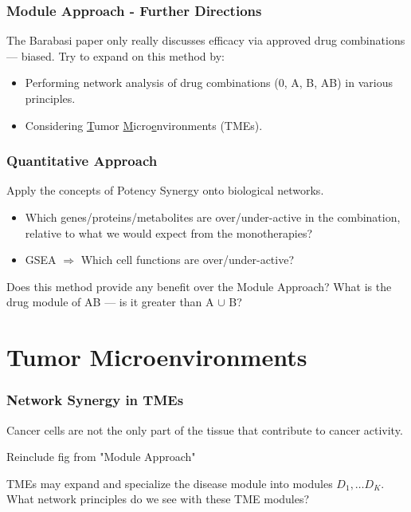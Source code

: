 \documentclass{beamer}
\begin{document}
\begin{frame}
  \frametitle{Module Approach - Further Directions}
  The Barabasi paper only really discusses efficacy via approved drug combinations --- biased.
  \vfill
  Try to expand on this method by:
  \begin{itemize}
      \item Performing network analysis of drug combinations (0, A, B, AB) in various principles.
      \item Considering \underline{T}umor \underline{M}icro\underline{e}nvironments (TMEs).
  \end{itemize}
\end{frame}

\begin{frame}
  \frametitle{Quantitative Approach}

  Apply the concepts of Potency Synergy onto biological networks.

  \begin{itemize}
    \item Which genes/proteins/metabolites are over/under-active in the combination, relative to what we would expect from the monotherapies?
    \item GSEA $\Rightarrow$ Which cell functions are over/under-active?
  \end{itemize}

  \vfill

  Does this method provide any benefit over the Module Approach? What is the drug module of AB --- is it greater than A $\cup$ B?
\end{frame}

\section{Tumor Microenvironments}

\begin{frame}
  \frametitle{Network Synergy in TMEs}
  Cancer cells are not the only part of the tissue that contribute to cancer activity.

  Reinclude fig from "Module Approach"

  TMEs may expand and specialize the disease module into modules $D_1, \ldots D_K$. 
  What network principles do we see with these TME modules?
\end{frame}
\end{document}
